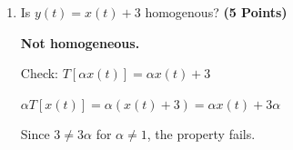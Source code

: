 \documentclass[12pt, xcolor=dvipsnames,svgnames,x11names]{article}
\begin{document}
\begin{enumerate}
\begin{tcolorbox}
\textbf{Not additive.} 

Check: $T[x_1(t) + x_2(t)] = (x_1(t) + x_2(t)) + 3$


$T[x_1(t)] + T[x_2(t)] = (x_1(t) + 3) + (x_2(t) + 3) = x_1(t) + x_2(t) + 6$

Since $3 \neq 6$, the property fails.
    
\end{tcolorbox}

\item Is $y(t) = x(t) + 3$ homogenous? \hfill \textbf{(5 Points)}


\begin{tcolorbox}[
    enhanced,breakable,
    colback=androidBlueLight!80,
    colframe=androidBlue,
    arc=5pt,
    boxrule=1pt,
    title=\textbf{Answer},
    fonttitle=\bfseries,
    coltitle=black,
    top=10pt,
    bottom=8pt,
    left=8pt,
    right=8pt,
    attach boxed title to top left={xshift=10pt, yshift=-\tcboxedtitleheight/2},
    boxed title style={
    colback=androidBlue,    
        colframe=androidBlue,
        arc=3pt,
        boxrule=0pt,
        left=6pt, right=6pt,
        top=3pt, bottom=3pt
    }
    ]

\textbf{Not homogeneous.}

Check: $T[\alpha x(t)] = \alpha x(t) + 3$ 

$\alpha T[x(t)] = \alpha (x(t) + 3) = \alpha x(t) + 3\alpha$ 

Since $3 \neq 3\alpha$ for $\alpha \neq 1$, the property fails.
    
\end{tcolorbox}

\end{enumerate}
\end{document}
